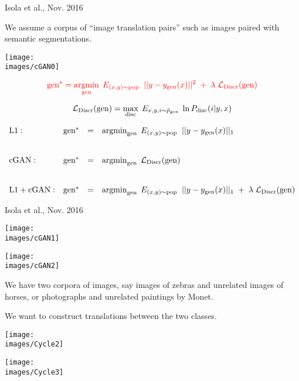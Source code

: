 {
{Isola et al., Nov. 2016}

We assume a corpus of ``image translation pairs'' such as images paired with semantic segmentations.

\centerline{\texttt{[image: \\images/cGAN0]}}



$${\color{red} \mathrm{gen}^* = \operatorname*{argmin}_{\mathrm{gen}}\;E_{(x,y) \sim \mathrm{pop}}\;\; ||y- y_{\mathrm{gen}}(x)||^2\; + \; \lambda\; {\cal L}_{\mathrm{Discr}}(\mathrm{gen})}$$

\vfill
$${\cal L}_\mathrm{Discr}(\mathrm{gen}) = \max_{\mathrm{disc}} \;E_{x,y,i \sim \tilde{p}_{\mathrm{gen}}}\; \ln P_{\mathrm{disc}}(i|y,x)$$


{\huge
$$\begin{array}{lrcl}
\mathrm{L1:} & \mathrm{gen}^* & = & \operatorname*{argmin}_{\mathrm{gen}}\;E_{(x,y) \sim \mathrm{pop}}\;\; ||y - y_{\mathrm{gen}}(x)||_1 \\
\\
\\
\mathrm{cGAN:} & \mathrm{gen}^* & = & \operatorname*{argmin}_{\mathrm{gen}}\;{\cal L}_{\mathrm{Discr}}(\mathrm{gen}) \\
\\
\\
\mathrm{L1 + cGAN:} & \mathrm{gen}^* & = & \operatorname*{argmin}_{\mathrm{gen}}\;E_{(x,y) \sim \mathrm{pop}}\;\; ||y - y_{\mathrm{gen}}(x)||_1\; +\; \lambda\; {\cal L}_\mathrm{Discr}(\mathrm{gen})
\end{array}$$
}


{Isola et al., Nov. 2016}

\centerline{\texttt{[image: \\images/cGAN1]}}


\centerline{\texttt{[image: \\images/cGAN2]}}


We have two corpora of images, say images of zebras and unrelated images of horses, or photographs and unrelated paintings by Monet.

\vfill
We want to construct translations between the two classes.

\centerline{\texttt{[image: \\images/Cycle2]}}


\centerline{\texttt{[image: \\images/Cycle3]}}

}
